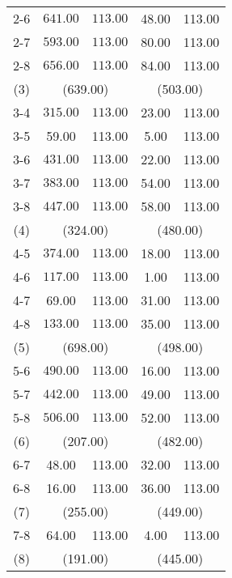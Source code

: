 \begin{table}[ht]
\begin{tabular*}{\textwidth}{@{\extracolsep{\fill} }ccccc}
  2-6 & \(\mathbf{641.00}\) & \(\mathbf{113.00}\) & 48.00 & 113.00 \\ 
  2-7 & \(\mathbf{593.00}\) & \(\mathbf{113.00}\) & 80.00 & 113.00 \\ 
  2-8 & \(\mathbf{656.00}\) & \(\mathbf{113.00}\) & 84.00 & 113.00 \\ 
   [1ex]
(3) & \multicolumn{2}{c}{(639.00)} & \multicolumn{2}{c}{(503.00)} \\
   3-4 & \(\mathbf{315.00}\) & \(\mathbf{113.00}\) & 23.00 & 113.00 \\ 
  3-5 & 59.00 & 113.00 & 5.00 & 113.00 \\ 
  3-6 & \(\mathbf{431.00}\) & \(\mathbf{113.00}\) & 22.00 & 113.00 \\ 
  3-7 & \(\mathbf{383.00}\) & \(\mathbf{113.00}\) & 54.00 & 113.00 \\ 
  3-8 & \(\mathbf{447.00}\) & \(\mathbf{113.00}\) & 58.00 & 113.00 \\ 
   [1ex]
(4) & \multicolumn{2}{c}{(324.00)} & \multicolumn{2}{c}{(480.00)} \\   
   4-5 & \(\mathbf{374.00}\) & \(\mathbf{113.00}\) & 18.00 & 113.00 \\ 
  4-6 & \(\mathbf{117.00}\) & \(\mathbf{113.00}\) & 1.00 & 113.00 \\ 
  4-7 & 69.00 & 113.00 & 31.00 & 113.00 \\ 
  4-8 & \(\mathbf{133.00}\) & \(\mathbf{113.00}\) & 35.00 & 113.00 \\ 
   [1ex]
(5) & \multicolumn{2}{c}{(698.00)} & \multicolumn{2}{c}{(498.00)} \\   
   5-6 & \(\mathbf{490.00}\) & \(\mathbf{113.00}\) & 16.00 & 113.00 \\ 
  5-7 & \(\mathbf{442.00}\) & \(\mathbf{113.00}\) & 49.00 & 113.00 \\ 
  5-8 & \(\mathbf{506.00}\) & \(\mathbf{113.00}\) & 52.00 & 113.00 \\ 
   [1ex]
(6) & \multicolumn{2}{c}{(207.00)} & \multicolumn{2}{c}{(482.00)} \\   
   6-7 & 48.00 & 113.00 & 32.00 & 113.00 \\ 
  6-8 & 16.00 & 113.00 & 36.00 & 113.00 \\ 
   [1ex]
   (7) & \multicolumn{2}{c}{(255.00)} & \multicolumn{2}{c}{(449.00)} \\
   7-8 & 64.00 & 113.00 & 4.00 & 113.00 \\[1ex]
   (8) & \multicolumn{2}{c}{(191.00)} & \multicolumn{2}{c}{(445.00)} \\ 
   \bottomrule
\end{tabular*}

\end{table}

